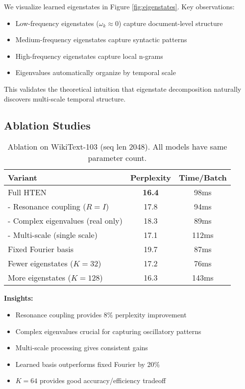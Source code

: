 \documentclass[11pt,letterpaper]{article}
\begin{document}
We visualize learned eigenstates in Figure \ref{fig:eigenstates}. Key observations:

\begin{itemize}
    \item Low-frequency eigenstates ($\omega_k \approx 0$) capture document-level structure
    \item Medium-frequency eigenstates capture syntactic patterns
    \item High-frequency eigenstates capture local n-grams
    \item Eigenvalues automatically organize by temporal scale
\end{itemize}

This validates the theoretical intuition that eigenstate decomposition naturally discovers multi-scale temporal structure.

\subsection{Ablation Studies}

\begin{table}[h]
\centering
\caption{Ablation on WikiText-103 (seq len 2048). All models have same parameter count.}
\label{tab:ablation}
\begin{tabular}{lcc}
\toprule
\textbf{Variant} & \textbf{Perplexity} & \textbf{Time/Batch} \\
\midrule
Full HTEN & \textbf{16.4} & 98ms \\
\quad - Resonance coupling ($R = I$) & 17.8 & 94ms \\
\quad - Complex eigenvalues (real only) & 18.3 & 89ms \\
\quad - Multi-scale (single scale) & 17.1 & 112ms \\
Fixed Fourier basis & 19.7 & 87ms \\
Fewer eigenstates ($K=32$) & 17.2 & 76ms \\
More eigenstates ($K=128$) & 16.3 & 143ms \\
\bottomrule
\end{tabular}
\end{table}

\textbf{Insights:}
\begin{itemize}
    \item Resonance coupling provides 8\% perplexity improvement
    \item Complex eigenvalues crucial for capturing oscillatory patterns
    \item Multi-scale processing gives consistent gains
    \item Learned basis outperforms fixed Fourier by 20\%
    \item $K=64$ provides good accuracy/efficiency tradeoff
\end{itemize}
\end{document}
